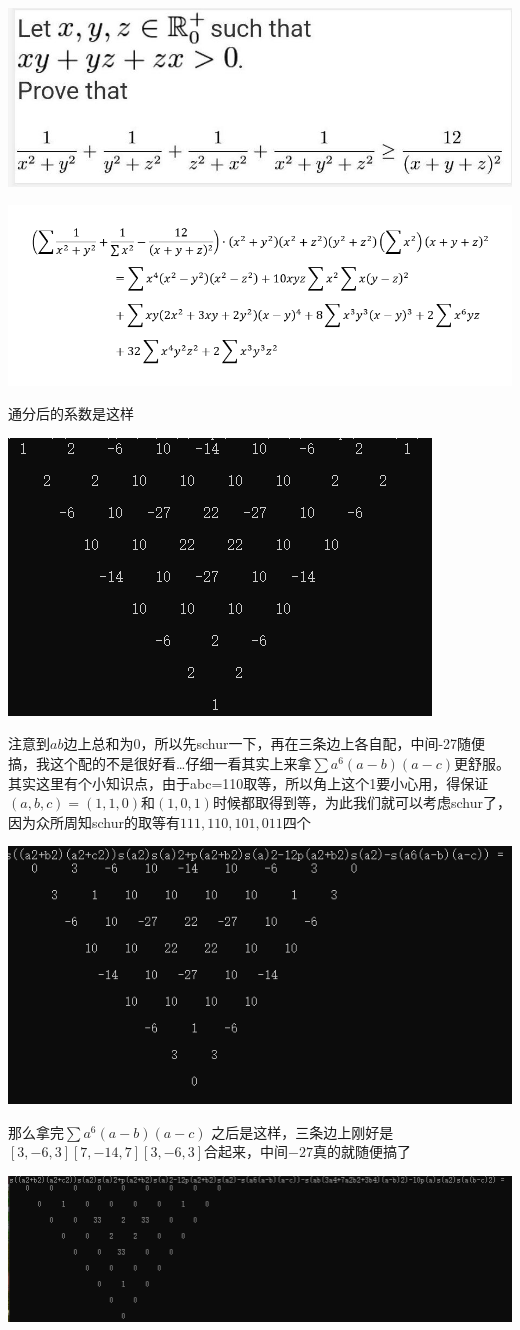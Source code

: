 \documentclass[UTF8]{ctexart}
\begin{document}
\subsection{}
\begin{center}
	\includegraphics[width=0.6\linewidth]{a010}
\end{center}
\begin{center}
	\includegraphics[width=0.7\linewidth]{a020}
\end{center}
通分后的系数是这样
\begin{center}
	\includegraphics[width=0.7\linewidth]{a030}
\end{center}
注意到$ ab $边上总和为0，所以先schur一下，再在三条边上各自配，中间-27随便搞，我这个配的不是很好看…仔细一看其实上来拿$  \displaystyle \sum a^{6}(a-b)(a-c) $更舒服。其实这里有个小知识点，由于abc=110取等，所以角上这个1要小心用，得保证$ (a,b,c)=(1,1,0) $和$ (1,0,1) $时候都取得到等，为此我们就可以考虑schur了，因为众所周知schur的取等有$ 111,110,101,011 $四个
\begin{center}
	\includegraphics[width=0.7\linewidth]{a040}
\end{center}
那么拿完$  \displaystyle \sum a^{6}(a-b)(a-c) $ 之后是这样，三条边上刚好是$ [3,-6,3][7,-14,7][3,-6,3] $合起来，中间$ -27 $真的就随便搞了
\begin{center}
	\includegraphics[width=0.7\linewidth]{a050}
\end{center}
\end{document}
